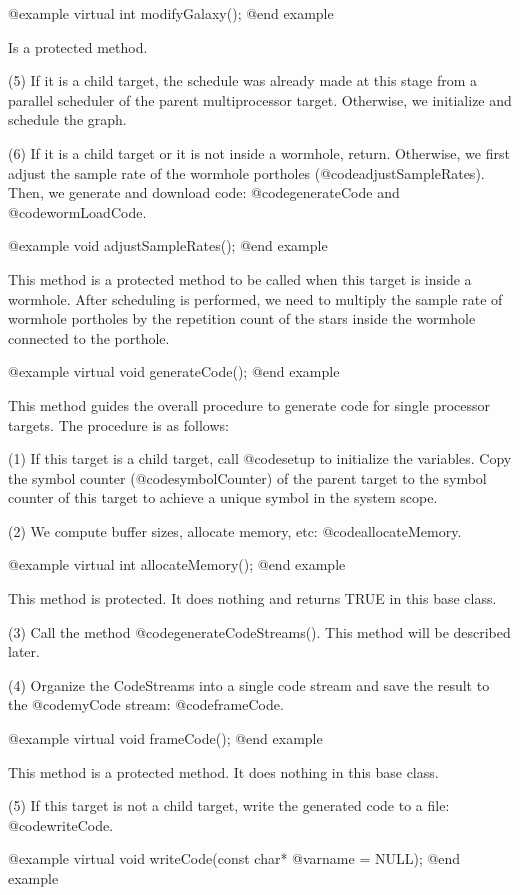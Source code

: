 @example
virtual int modifyGalaxy();
@end example

Is a protected method.

(5) If it is a child target, the schedule was already made at this stage
from a parallel scheduler of the parent multiprocessor target. Otherwise,
we initialize and schedule the graph.

(6) If it is a child target or it is not inside a wormhole, return.
Otherwise, we first adjust the sample rate of the wormhole portholes
(@code{adjustSampleRates}). Then, we generate and download code:
@code{generateCode} and @code{wormLoadCode}.

@example
void adjustSampleRates();
@end example

This method is a protected method to be called when this target is
inside a wormhole. After scheduling is performed, we need to multiply
the sample rate of wormhole portholes by the repetition
count of the stars inside the wormhole connected to the porthole.

@example
virtual void generateCode();
@end example

This method guides the overall procedure to generate code for single
processor targets. The procedure is as follows:

(1) If this target is a child target, call @code{setup} to initialize the
variables. Copy the symbol counter (@code{symbolCounter}) of the parent
target to the symbol counter of this target to achieve a unique symbol
in the system scope.

(2) We compute buffer sizes, allocate memory, etc: @code{allocateMemory}.

@example
virtual int allocateMemory();
@end example

This method is protected. It does nothing and returns TRUE in this
base class.

(3) Call the method @code{generateCodeStreams()}.  This method will be
described later.

(4) Organize the CodeStreams into a single code stream and save the result
to the @code{myCode} stream: @code{frameCode}.

@example
virtual void frameCode();
@end example

This method is a protected method. It does nothing in this base
class.

(5) If this target is not a child target, write the generated code
to a file: @code{writeCode}.

@example
virtual void writeCode(const char* @var{name} = NULL);
@end example

